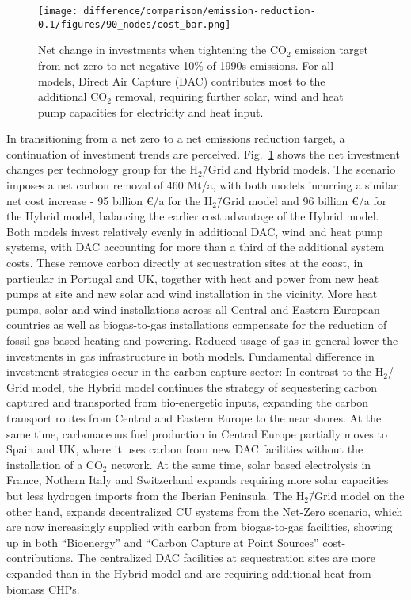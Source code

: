 \documentclass[twocolumn]{article}
\newcommand{\COtwo}{CO$_2$}
\newcommand{\Hgrid}{H$_2$\=/Grid}
\newcommand{\modH}{H$_2$\=/Grid model}
\newcommand{\modHybrid}{Hybrid model}
\newcommand{\carbon}{CO$_2$}
\begin{document}
\begin{figure}[htb!]
    \centering
    \texttt{[image: difference/comparison/emission-reduction-0.1/figures/90\_nodes/cost\_bar.png]}
    \caption[short]{Net change in investments when tightening the \COtwo{} emission target from net-zero to net-negative 10\% of 1990s emissions. For all models, Direct Air Capture (DAC) contributes most to the additional \carbon{} removal, requiring further solar, wind and heat pump capacities for electricity and heat input.}
    \label{fig:net-negative_cost_bar}
\end{figure}


In transitioning from a net zero to a net emissions reduction target, a continuation of investment trends are perceived. Fig.~\ref{fig:net-negative_cost_bar} shows the net investment changes per technology group for the \Hgrid{} and \modHybrid{}s. The scenario imposes a net carbon removal of 460 Mt/a, with both models incurring a similar net cost increase - 95 billion €/a for the \modH{} and 96 billion €/a for the \modHybrid{}, balancing the earlier cost advantage of the \modHybrid{}. Both models invest relatively evenly in additional DAC, wind and heat pump systems, with DAC accounting for more than a third of the additional system costs. These remove carbon directly at sequestration sites at the coast, in particular in Portugal and UK, together with heat and power from new heat pumps at site and new solar and wind installation in the vicinity.
More heat pumps, solar and wind installations across all Central and Eastern European countries as well as biogas-to-gas installations compensate for the reduction of fossil gas based heating and powering. Reduced usage of gas in general lower the investments in gas infrastructure in both models.
Fundamental difference in investment strategies occur in the carbon capture sector: In contrast to the \modH{}, the \modHybrid{} continues the strategy of sequestering carbon captured and transported from bio-energetic inputs, expanding the carbon transport routes from Central and Eastern Europe to the near shores. At the same time, carbonaceous fuel production in Central Europe partially moves to Spain and UK, where it uses carbon from new DAC facilities without the installation of a \COtwo{} network. At the same time, solar based electrolysis in France, Nothern Italy and Switzerland expands requiring more solar capacities but less hydrogen imports from the Iberian Peninsula.
The \modH{} on the other hand, expands decentralized CU systems from the Net-Zero scenario, which are now increasingly supplied with carbon from biogas-to-gas facilities, showing up in both ``Bioenergy'' and ``Carbon Capture at Point Sources'' cost-contributions. The centralized DAC facilities at sequestration sites are more expanded than in the \modHybrid{} and are requiring additional heat from biomass CHPs.
\end{document}
